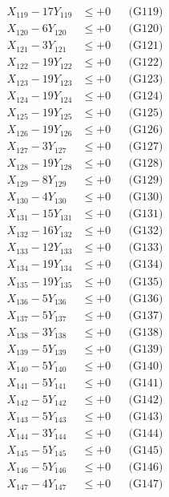 \documentclass[a4paper,10pt]{article}
\begin{document}
{\begin{align}
X_{119} - 17Y_{119} &\leq +0 && \text{(G119)} \\
X_{120} - 6Y_{120} &\leq +0 && \text{(G120)} \\
X_{121} - 3Y_{121} &\leq +0 && \text{(G121)} \\
X_{122} - 19Y_{122} &\leq +0 && \text{(G122)} \\
X_{123} - 19Y_{123} &\leq +0 && \text{(G123)} \\
X_{124} - 19Y_{124} &\leq +0 && \text{(G124)} \\
X_{125} - 19Y_{125} &\leq +0 && \text{(G125)} \\
\allowbreak
X_{126} - 19Y_{126} &\leq +0 && \text{(G126)} \\
X_{127} - 3Y_{127} &\leq +0 && \text{(G127)} \\
X_{128} - 19Y_{128} &\leq +0 && \text{(G128)} \\
X_{129} - 8Y_{129} &\leq +0 && \text{(G129)} \\
X_{130} - 4Y_{130} &\leq +0 && \text{(G130)} \\
X_{131} - 15Y_{131} &\leq +0 && \text{(G131)} \\
X_{132} - 16Y_{132} &\leq +0 && \text{(G132)} \\
X_{133} - 12Y_{133} &\leq +0 && \text{(G133)} \\
X_{134} - 19Y_{134} &\leq +0 && \text{(G134)} \\
X_{135} - 19Y_{135} &\leq +0 && \text{(G135)} \\
\allowbreak
X_{136} - 5Y_{136} &\leq +0 && \text{(G136)} \\
X_{137} - 5Y_{137} &\leq +0 && \text{(G137)} \\
X_{138} - 3Y_{138} &\leq +0 && \text{(G138)} \\
X_{139} - 5Y_{139} &\leq +0 && \text{(G139)} \\
X_{140} - 5Y_{140} &\leq +0 && \text{(G140)} \\
X_{141} - 5Y_{141} &\leq +0 && \text{(G141)} \\
X_{142} - 5Y_{142} &\leq +0 && \text{(G142)} \\
X_{143} - 5Y_{143} &\leq +0 && \text{(G143)} \\
X_{144} - 3Y_{144} &\leq +0 && \text{(G144)} \\
X_{145} - 5Y_{145} &\leq +0 && \text{(G145)} \\
\allowbreak
X_{146} - 5Y_{146} &\leq +0 && \text{(G146)} \\
X_{147} - 4Y_{147} &\leq +0 && \text{(G147)} \\

\end{align}}
\end{document}

